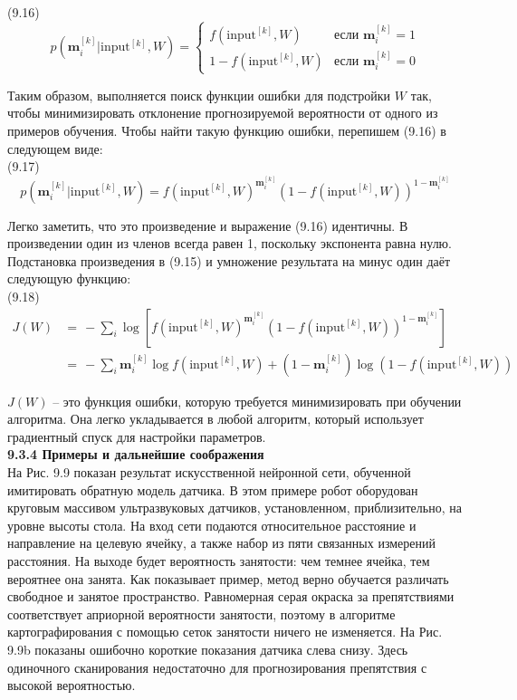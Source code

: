 \documentclass[10pt,a4paper]{article}
\begin{document}
(9.16)
\begin{equation*}
p(\textbf{m}_i^{[k]}|\text{input}^{[k]},W) = \left\{
\begin{array}{ll}
f(\text{input}^{[k]},W)& \mbox{если}\,\,\textbf{m}_i^{[k]}=1 \\
1-f(\text{input}^{[k]},W)& \mbox{если}\,\,\textbf{m}_i^{[k]}=0
\end{array}
\right.
\end{equation*}

Таким образом, выполняется поиск функции ошибки для подстройки $W$ так, чтобы минимизировать отклонение прогнозируемой вероятности от 
одного из примеров обучения. Чтобы найти такую функцию ошибки, перепишем (9.16) в следующем виде:\\

(9.17)
$$p(\textbf{m}_i^{[k]}|\text{input}^{[k]},W) = f(\text{input}^{[k]},W)^{\textbf{m}_i^{[k]}}(1-f(\text{input}^{[k]},W))^{1-\textbf{m}_i^{[k]}}$$

Легко заметить, что это произведение и выражение (9.16) идентичны. В произведении один из членов всегда равен 1, поскольку экспонента равна нулю. Подстановка произведения в (9.15) и умножение результата на минус один даёт следующую функцию:\\

(9.18)
\begin{equation*}
\begin{split}
J(W)&=\,-\sum_i\log\left[f(\text{input}^{[k]},W)^{\textbf{m}_i^{[k]}}(1-f(\text{input}^{[k]},W))^{1-\textbf{m}_i^{[k]}}\right]  \\
&=\,-\sum_i \textbf{m}_i^{[k]}\log f(\text{input}^{[k]},W)+(1-\textbf{m}_i^{[k]})\log (1-f(\text{input}^{[k]},W))
\end{split}
\end{equation*}

$J(W)$ – это функция ошибки, которую требуется минимизировать при обучении алгоритма. Она легко укладывается в любой алгоритм, который использует градиентный спуск для настройки параметров.\\

\textbf{9.3.4	Примеры и дальнейшие соображения}\\

На Рис. 9.9 показан результат искусственной нейронной сети, обученной имитировать обратную модель датчика. В этом примере робот оборудован круговым массивом ультразвуковых датчиков, установленном, приблизительно, на уровне высоты стола. На вход сети подаются относительное расстояние и направление на целевую ячейку, а также набор из пяти связанных измерений расстояния. На выходе будет вероятность занятости: чем темнее ячейка, тем вероятнее она занята. Как показывает пример, метод верно обучается различать свободное и занятое пространство. Равномерная серая окраска за препятствиями соответствует априорной вероятности занятости, поэтому в алгоритме картографирования с помощью сеток занятости ничего не изменяется. На Рис. 9.9b показаны ошибочно короткие показания датчика слева снизу. Здесь одиночного сканирования недостаточно для прогнозирования препятствия с высокой вероятностью.
\end{document}
